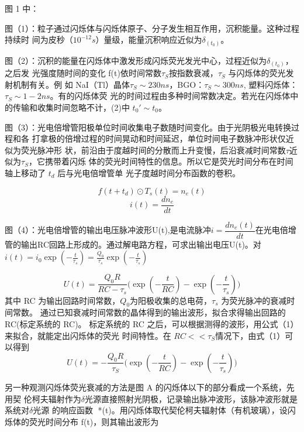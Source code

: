 \documentclass{article}
\begin{document}
	
	图 1 中：
	
	
	图（1）：粒子通过闪烁体与闪烁体原子、分子发生相互作用，沉积能量。这种过程持续时
	间为皮秒（$ 10^{-12}s $）量级，能量沉积响应近似为$ \delta_(t_0)。 $
	
	
	图（2）：沉积的能量在闪烁体中激发形成闪烁荧光发光中心，过程近似为$ \delta_(t_0) $，之后发
	光强度随时间的变化 f(t)依时间常数$ \tau_S $按指数衰减，$ \tau_S $ 与闪烁体的荧光发射机制有关。例
	如 NaI（Tl）晶体$ \tau_S \sim 230ns $，BGO：$ \tau_S \sim 300ns $, 塑料闪烁体：$ \tau_S\sim1-2ns $。有的闪烁体荧
	光的时间过程由多种时间常数决定。若光在闪烁体中的传输和收集时间忽略不计，(2)中
	$t_0'\sim t_0$。
	
	
	图（3）：光电倍增管阳极单位时间收集电子数随时间变化。由于光阴极光电转换过程和各
	打拿极的倍增过程的时间晃动和时间延迟，单位时间电子数脉冲形状仅近似为荧光脉冲形
	状，前沿由于度越时间的分散而上升变慢，后沿衰减时间常数$ \tau $近似为$\tau_S$，它携带着闪烁
	体的荧光时间特性的信息。所以它是荧光时间分布在时间轴上移动了 $ t_d $ 后与光电倍增管单
	光子度越时间分布函数的卷积。
	
	\begin{equation}
		f(t+t_d)\odot T_s(t)=n_e(t)
	\end{equation}
	\begin{equation}
		i(t)=\dfrac{dn_e}{dt}
	\end{equation}
	
	
	图（4）：光电倍增管的输出电压脉冲波形U(t),是电流脉冲$ i=\dfrac{dn_e(t)}{dt} $在光电倍增管的输出RC回路上形成的。通过解电路方程，可求出输出电压U(t)。对$ i(t)=i_0\exp(-\frac{t}{\tau_s})=\frac{Q_0}{\tau_s}\exp(-\frac{t}{\tau_s}) $
	
	\begin{equation}
		U(t)=\frac{Q_0 R}{RC-\tau_s}\big(\exp(-\frac{t}{RC})-\exp(-\frac{t}{\tau_s})\big)
	\end{equation}
	其中 RC 为输出回路时间常数，$ Q_0 $为阳极收集的总电荷，$\tau_s$ 为荧光脉冲的衰减时间常数。
	通过已知衰减时间常数的晶体得到的输出波形，拟合求得输出回路的 RC(标定系统的 RC)。
	标定系统的 RC 之后，可以根据测得的波形，用公式（1）来拟合，就能定出闪烁体的荧光
	时间特性。在 $ RC<<τ_S $情况下，由式（1）可以得到
	\begin{equation}
		U(t)=-\frac{Q_0 R}{\tau_S}\big(\exp(-\frac{t}{RC})-\exp(-\frac{t}{\tau_s})\big)
	\end{equation}
	
	
	另一种观测闪烁体荧光衰减的方法是图 A 的闪烁体以下的部分看成一个系统，先用契
	伦柯夫辐射作为$\delta$光源直接照射光阴极，记录输出脉冲波形，该脉冲波形就是系统对$\delta$光源
	的响应函数 *(t)。用闪烁体取代契伦柯夫辐射体（有机玻璃），设闪烁体的荧光时间分布
	f(t)，则其输出波形为
	
\end{document}
